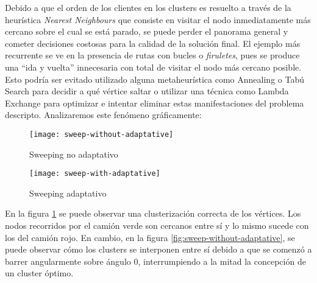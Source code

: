 Debido a que el orden de los clientes en los clusters es resuelto a través de la heurística \textit{Nearest Neighbours} que consiste en visitar el nodo inmediatamente más cercano sobre el cual se está parado, se puede perder el panorama general y cometer decisiones costosas para la calidad de la solución final. El ejemplo más recurrente se ve en la presencia de rutas con bucles o \textit{firuletes}, pues se produce una ``ida y vuelta'' innecesaria con total de visitar el nodo más cercano posible. Esto podría ser evitado utilizado alguna metaheurística como Annealing o Tabú Search para decidir a qué vértice saltar o utilizar una técnica como Lambda Exchange para optimizar e intentar eliminar estas manifestaciones del problema descripto. Analizaremos este fenómeno gráficamente:

\begin{figure}[H]
	\centering
	\begin{minipage}{0.48\textwidth}
		\centering
		\texttt{[image: sweep-without-adaptative]}
		\caption{\footnotesize Sweeping no adaptativo}
		\label{fig:sweep-without-adaptative}
	\end{minipage}%
	\hspace{0.03\textwidth}
	\begin{minipage}{0.48\textwidth}
		\centering
		\texttt{[image: sweep-with-adaptative]}
		\caption{\footnotesize Sweeping adaptativo}
		\label{fig:sweep-with-adaptative}
	\end{minipage}%
\end{figure}

En la figura \ref{fig:sweep-with-adaptative} se puede observar una clusterización correcta de los vértices. Los nodos recorridos por el camión verde son cercanos entre sí y lo mismo sucede con los del camión rojo. En cambio, en la figura \ref{fig:sweep-without-adaptative}, se puede observar cómo los clusters se interponen entre sí debido a que se comenzó a barrer angularmente sobre ángulo $0$, interrumpiendo a la mitad la concepción de un cluster óptimo.

